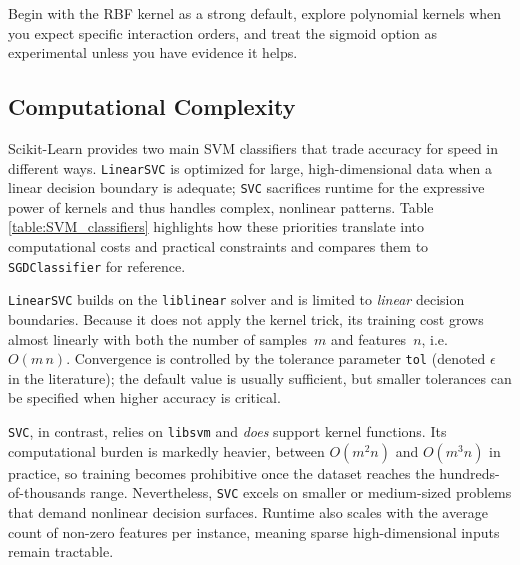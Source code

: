 \documentclass[12pt,letter]{article}
\begin{document}
\begin{mdframed}[middlelinewidth=0.5mm]
\begin{center}
\end{center}
Begin with the RBF kernel as a strong default, explore polynomial kernels when you expect specific interaction orders, and treat the sigmoid option as experimental unless you have evidence it helps.
\end{mdframed}

\subsection{Computational Complexity}

Scikit-Learn provides two main SVM classifiers that trade accuracy for speed in different ways.  
\texttt{LinearSVC} is optimized for large, high-dimensional data when a linear decision boundary is adequate; \texttt{SVC} sacrifices runtime for the expressive power of kernels and thus handles complex, nonlinear patterns. Table \ref{table:SVM_classifiers} highlights how these priorities translate into computational costs and practical constraints and compares them to \texttt{SGDClassifier} for reference.

\texttt{LinearSVC} builds on the \texttt{liblinear} solver and is limited to \emph{linear} decision boundaries.  
Because it does not apply the kernel trick, its training cost grows almost linearly with both the number of samples~\(m\) and features~\(n\), i.e.\ \(O(m\,n)\). Convergence is controlled by the tolerance parameter \texttt{tol} (denoted \(\epsilon\) in the literature); the default value is usually sufficient, but smaller tolerances can be specified when higher accuracy is critical.

\texttt{SVC}, in contrast, relies on \texttt{libsvm} and \emph{does} support kernel functions. Its computational burden is markedly heavier, between \(O(m^{2} n)\) and \(O(m^{3} n)\) in practice, so training becomes prohibitive once the dataset reaches the hundreds-of-thousands range. Nevertheless, \texttt{SVC} excels on smaller or medium-sized problems that demand nonlinear decision surfaces. Runtime also scales with the average count of non-zero features per instance, meaning sparse high-dimensional inputs remain tractable. 
\end{document}

